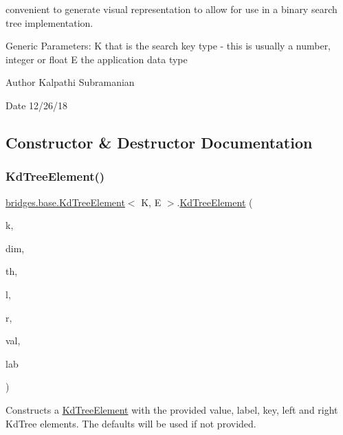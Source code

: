 convenient to generate visual representation to allow for use in a binary search tree implementation.

Generic Parameters\+: K that is the search key type -\/ this is usually a number, integer or float E the application data type

\begin{DoxyAuthor}{Author}
Kalpathi Subramanian 
\end{DoxyAuthor}
\begin{DoxyDate}{Date}
12/26/18 
\end{DoxyDate}


\subsection{Constructor \& Destructor Documentation}
\mbox{\label{classbridges_1_1base_1_1_kd_tree_element_a6acdec52089792d20747c10f56139217}} 
\subsubsection{\texorpdfstring{KdTreeElement()}{KdTreeElement()}\hspace{0.1cm}{\footnotesize\ttfamily [1/10]}}
{\footnotesize\ttfamily \mbox{\hyperlink{classbridges_1_1base_1_1_kd_tree_element}{bridges.\+base.\+Kd\+Tree\+Element}}$<$ K, E $>$.\mbox{\hyperlink{classbridges_1_1base_1_1_kd_tree_element}{Kd\+Tree\+Element}} (\begin{DoxyParamCaption}\item[{K}]{k,  }\item[{int}]{dim,  }\item[{float}]{th,  }\item[{\mbox{\hyperlink{classbridges_1_1base_1_1_kd_tree_element}{Kd\+Tree\+Element}}$<$ K, E $>$}]{l,  }\item[{\mbox{\hyperlink{classbridges_1_1base_1_1_kd_tree_element}{Kd\+Tree\+Element}}$<$ K, E $>$}]{r,  }\item[{E}]{val,  }\item[{String}]{lab }\end{DoxyParamCaption})}

Constructs a \mbox{\hyperlink{classbridges_1_1base_1_1_kd_tree_element}{Kd\+Tree\+Element}} with the provided value, label, key, left and right Kd\+Tree elements. The defaults will be used if not provided.


